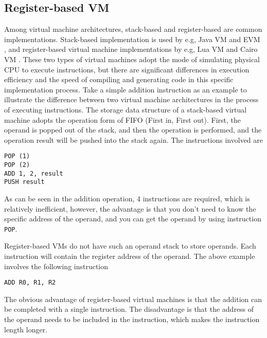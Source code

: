 \subsection{Register-based VM}

Among virtual machine architectures, stack-based and register-based are common implementations. Stack-based implementation is used by e.g, Java VM \cite{gunther2019scenery} and EVM \cite{website:evm}, and register-based virtual machine implementations by e.g, Lua VM \cite{ierusalimschy2005implementation} and Cairo VM \cite{cryptoeprint:2021/1063}. These two types of virtual machines adopt the mode of simulating physical CPU to execute instructions, but there are significant differences in execution efficiency and the speed of compiling and generating code in this specific implementation process. Take a simple addition instruction as an example to illustrate the difference between two virtual machine architectures in the process of executing instructions. The storage data structure of a stack-based virtual machine adopts the operation form of FIFO (First in, First out). First, the operand is popped out of the stack, and then the operation is performed, and the operation result will be pushed into the stack again. The instructions involved are
\begin{lstlisting}
POP (1)
POP (2)
ADD 1, 2, result
PUSH result
\end{lstlisting}
As can be seen in the addition operation, 4 instructions are required, which is relatively inefficient, however, the advantage is that you don't need to know the specific address of the operand, and you can get the operand by using instruction \verb|POP|.

Register-based VMs do not have such an operand stack to store operands. Each instruction will contain the register address of the operand. The above example involves the following instruction
\begin{lstlisting}
ADD R0, R1, R2
\end{lstlisting}

The obvious advantage of register-based virtual machines is that the addition can be completed with a single instruction. The disadvantage is that the address of the operand needs to be included in the instruction, which makes the instruction length longer.

